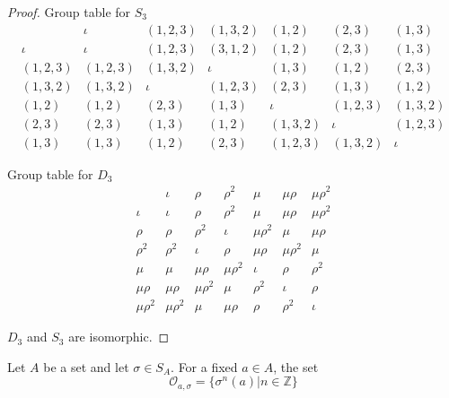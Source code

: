 \begin{proof}
    Group table for $S_{3}$
    \[
        \begin{array}{c|cccccc}
                      & \iota     & (1, 2, 3) & (1, 3, 2) & (1, 2)    & (2, 3)    & (1, 3)    \\
            \hline
            \iota     & \iota     & (1, 2, 3) & (3, 1, 2) & (1, 2)    & (2, 3)    & (1, 3)    \\
            (1, 2, 3) & (1, 2, 3) & (1, 3, 2) & \iota     & (1, 3)    & (1, 2)    & (2, 3)    \\
            (1, 3, 2) & (1, 3, 2) & \iota     & (1, 2, 3) & (2, 3)    & (1, 3)    & (1, 2)    \\
            (1, 2)    & (1, 2)    & (2, 3)    & (1, 3)    & \iota     & (1, 2, 3) & (1, 3, 2) \\
            (2, 3)    & (2, 3)    & (1, 3)    & (1, 2)    & (1, 3, 2) & \iota     & (1, 2, 3) \\
            (1, 3)    & (1, 3)    & (1, 2)    & (2, 3)    & (1, 2, 3) & (1, 3, 2) & \iota
        \end{array}
    \]

    Group table for $D_{3}$
    \[
        \begin{array}{c|cccccc}
                        & \iota       & \rho        & \rho^{2}    & \mu         & \mu\rho     & \mu\rho^{2} \\
            \hline
            \iota       & \iota       & \rho        & \rho^{2}    & \mu         & \mu\rho     & \mu\rho^{2} \\
            \rho        & \rho        & \rho^{2}    & \iota       & \mu\rho^{2} & \mu         & \mu\rho     \\
            \rho^{2}    & \rho^{2}    & \iota       & \rho        & \mu\rho     & \mu\rho^{2} & \mu         \\
            \mu         & \mu         & \mu\rho     & \mu\rho^{2} & \iota       & \rho        & \rho^{2}    \\
            \mu\rho     & \mu\rho     & \mu\rho^{2} & \mu         & \rho^{2}    & \iota       & \rho        \\
            \mu\rho^{2} & \mu\rho^{2} & \mu         & \mu\rho     & \rho        & \rho^{2}    & \iota
        \end{array}
    \]

    $D_{3}$ and $S_{3}$ are isomorphic.
\end{proof}

Let $A$ be a set and let $\sigma\in S_{A}$. For a fixed $a\in A$, the set
\[
    \mathcal{O}_{a,\sigma} = \{ \sigma^{n}(a) \vert n\in\mathbb{Z} \}
\]

